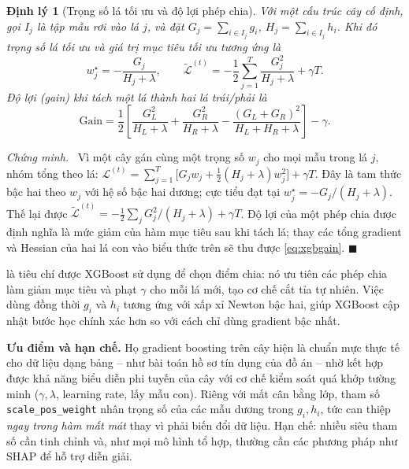 \documentclass[12pt,a4paper,oneside]{report}
\theoremstyle{vnplain}
\newtheorem{dlytheo}{Định lý}[chapter]
\theoremstyle{vndef}
\renewcommand{\proofname}{Chứng minh}
\renewenvironment{proof}[1][\proofname]{\par\noindent\textit{#1.}\ }{\hfill$\blacksquare$\par\vspace{4pt}}
\begin{document}
\begin{khungtheo}[breakable=false]
\begin{dlytheo}[Trọng số lá tối ưu và độ lợi phép chia]\label{dl:xgb}
Với một cấu trúc cây cố định, gọi $I_j$ là tập mẫu rơi vào lá $j$, và đặt
$G_j=\sum_{i\in I_j}g_i$, $H_j=\sum_{i\in I_j}h_i$. Khi đó trọng số lá tối ưu và giá trị
mục tiêu tối ưu tương ứng là
\begin{equation}
  w_j^\star=-\frac{G_j}{H_j+\lambda},
  \qquad
  \tilde{\mathcal{L}}^{(t)}=-\frac12\sum_{j=1}^{T}\frac{G_j^2}{H_j+\lambda}+\gamma T.
  \label{eq:wopt}
\end{equation}
Độ lợi (gain) khi tách một lá thành hai lá trái/phải là
\begin{equation}
  \mathrm{Gain}=\frac12\!\left[\frac{G_L^2}{H_L+\lambda}+\frac{G_R^2}{H_R+\lambda}
  -\frac{(G_L+G_R)^2}{H_L+H_R+\lambda}\right]-\gamma.
  \label{eq:xgbgain}
\end{equation}
\end{dlytheo}
\end{khungtheo}
\begin{proof}
Vì một cây gán cùng một trọng số $w_j$ cho mọi mẫu trong lá $j$, nhóm tổng theo lá:
$\mathcal{L}^{(t)}=\sum_{j=1}^{T}\big[G_j w_j+\frac12(H_j+\lambda)w_j^2\big]+\gamma T$. Đây
là tam thức bậc hai theo $w_j$ với hệ số bậc hai dương; cực tiểu đạt tại
$w_j^\star=-G_j/(H_j+\lambda)$. Thế lại được
$\tilde{\mathcal{L}}^{(t)}=-\frac12\sum_j G_j^2/(H_j+\lambda)+\gamma T$. Độ lợi của một
phép chia được định nghĩa là mức giảm của hàm mục tiêu sau khi tách lá; thay các tổng
gradient và Hessian của hai lá con vào biểu thức trên sẽ thu được \cref{eq:xgbgain}.
\end{proof}

\noindent {} là tiêu chí được XGBoost sử dụng để chọn điểm chia: nó
ưu tiên các phép chia làm giảm mục tiêu và phạt $\gamma$ cho mỗi lá mới, tạo cơ chế cắt tỉa
tự nhiên. Việc dùng đồng thời $g_i$ và $h_i$ tương ứng với xấp xỉ Newton bậc hai, giúp
XGBoost cập nhật bước học chính xác hơn so với cách chỉ dùng gradient bậc nhất.

\noindent\textbf{Ưu điểm và hạn chế.} Họ gradient boosting trên cây hiện là chuẩn mực
thực tế cho dữ liệu dạng bảng -- như bài toán hồ sơ tín dụng của đồ án -- nhờ kết hợp được
khả năng biểu diễn phi tuyến của cây với cơ chế kiểm soát quá khớp tường minh ($\gamma,\lambda$,
learning rate, lấy mẫu con). Riêng với mất cân bằng lớp, tham số
\texttt{scale\_pos\_weight} nhân trọng số của các mẫu dương trong $g_i,h_i$, tức can
thiệp \emph{ngay trong hàm mất mát} thay vì phải biến đổi dữ liệu. Hạn chế: nhiều siêu
tham số cần tinh chỉnh và, như mọi mô hình tổ hợp, thường cần các phương pháp như SHAP để hỗ trợ diễn giải.
\end{document}
